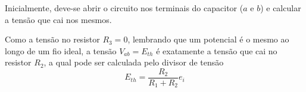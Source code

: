 \documentclass{article}
\numberwithin{equation}{section}
\newlength\Colsep
\begin{document}
\noindent\begin{minipage}{\textwidth}
\begin{minipage}[c][4cm][c]{\dimexpr0.5\textwidth-0.5\Colsep\relax}
    \begin{center}
    \end{center}
\end{minipage}
\begin{minipage}[c][4cm][c]{\dimexpr0.5\textwidth-0.5\Colsep\relax}
    Inicialmente, deve-se abrir o circuito nos terminais do capacitor ($a$ e $b$) e calcular a tensão que cai nos mesmos.
\end{minipage}
\end{minipage}

\noindent\begin{minipage}{\textwidth}
\begin{minipage}[c][4cm][c]{\dimexpr0.5\textwidth-0.5\Colsep\relax}
    \begin{center}
    \end{center}
\end{minipage}
\begin{minipage}[c][4cm][c]{\dimexpr0.5\textwidth-0.5\Colsep\relax}
    Como a tensão no resistor $R_3=0$, lembrando que um potencial é o mesmo ao longo de um fio ideal, a tensão $V_{ab}=E_{th}$ é exatamente a tensão que cai no resistor $R_2$, a qual pode ser calculada pelo divisor de tensão
    $$E_{th}=\frac{R_2}{R_1+R_2}e_i$$
\end{minipage}
\end{minipage}
\end{document}
